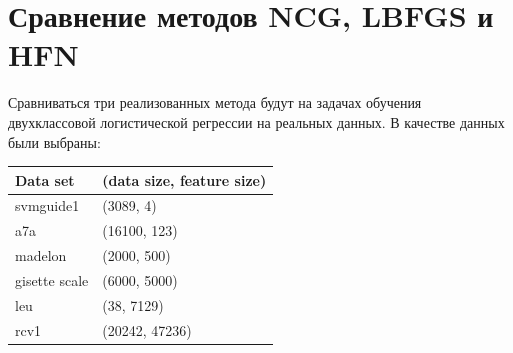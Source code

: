 \documentclass[12pt, a4paper]{article}
\begin{document}
    \section{Сравнение методов NCG, LBFGS и HFN}
        Сравниваться три реализованных метода будут на задачах обучения двухклассовой логистической регрессии на реальных данных. В качестве данных были выбраны:

        \begin{center}
        \begin{tabular}{ l | l }
            \bf{Data set} & \bf{(data size, feature size)}\\
            \hline
            svmguide1 & (3089, 4) \\
            a7a & (16100, 123) \\
            madelon & (2000, 500) \\
            gisette scale & (6000, 5000) \\
            leu & (38, 7129) \\
            rcv1 & (20242, 47236) \\
        \end{tabular}
        \end{center}
\end{document}
